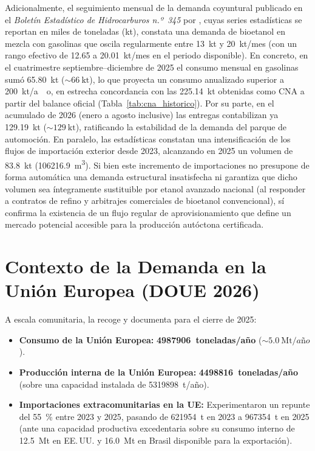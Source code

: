 \documentclass{report}
\begin{document}
Adicionalmente, el seguimiento mensual de la demanda coyuntural publicado en el \textit{Boletín Estadístico de Hidrocarburos n.º~345} por \textcite{CORES2026}, cuyas series estadísticas se reportan en miles de toneladas (\si{\kilo\tonne}), constata una demanda de bioetanol en mezcla con gasolinas que oscila regularmente entre \SI{13}{\kilo\tonne} y \SI{20}{\kilo\tonne/mes} (con un rango efectivo de \num{12.65} a \SI{20.01}{\kilo\tonne/mes} en el periodo disponible). En concreto, en el cuatrimestre septiembre--diciembre de 2025 el consumo mensual en gasolinas sumó \SI{65.80}{\kilo\tonne} ($\sim \SI{66}{\kilo\tonne}$), lo que proyecta un consumo anualizado superior a \SI{200}{\kilo\tonne/ao}, en estrecha concordancia con las \SI{225.14}{\kilo\tonne} obtenidas como CNA a partir del balance oficial \autocite{MITECO2026} (Tabla~\ref{tab:cna_historico}). Por su parte, en el acumulado de 2026 (enero a agosto inclusive) las entregas contabilizan ya \SI{129.19}{\kilo\tonne} ($\sim \SI{129}{\kilo\tonne}$), ratificando la estabilidad de la demanda del parque de automoción. En paralelo, las estadísticas constatan una intensificación de los flujos de importación exterior desde 2023, alcanzando en 2025 un volumen de \SI{83.8}{\kilo\tonne} (\SI{106216.9}{\cubic\meter}). Si bien este incremento de importaciones no presupone de forma automática una demanda estructural insatisfecha ni garantiza que dicho volumen sea íntegramente sustituible por etanol avanzado nacional (al responder a contratos de refino y arbitrajes comerciales de bioetanol convencional), sí confirma la existencia de un flujo regular de aprovisionamiento que define un mercado potencial accesible para la producción autóctona certificada.

\section{Contexto de la Demanda en la Unión Europea (DOUE 2026)}
A escala comunitaria, la \textcite[Considerandos~5, 9 y~10; Cuadro~1 y Nota~7]{DOUE2026} recoge y documenta para el cierre de 2025:
\begin{itemize}
    \item \textbf{Consumo de la Unión Europea:} \textbf{\num{4987906}~toneladas/año} ($\sim \SI{5.0}{\mega\tonne/a\text{\~{n}}o}$).
    \item \textbf{Producción interna de la Unión Europea:} \textbf{\num{4498816}~toneladas/año} (sobre una capacidad instalada de \num{5319898}~t/año).
    \item \textbf{Importaciones extracomunitarias en la UE:} Experimentaron un repunte del \SI{55}{\percent} entre 2023 y 2025, pasando de \num{621954}~t en 2023 a \num{967354}~t en 2025 (ante una capacidad productiva excedentaria sobre su consumo interno de \SI{12.5}{\mega\tonne} en EE.\,UU. y \SI{16.0}{\mega\tonne} en Brasil disponible para la exportación).
\end{itemize}
\end{document}
